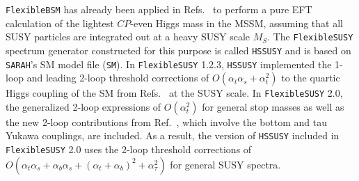 \documentclass[final,3p,11pt,pdflatex]{elsarticle}
\makeatletter
\newcommand{\modelname}[1]{\texttt{#1}\@\xspace}
\newcommand{\sarah}{\texttt{SARAH}\@\xspace}
\newcommand{\fs}{\texttt{FlexibleSUSY}\@\xspace}
\newcommand{\HSSUSY}{\modelname{HSSUSY}}
\newcommand{\fstwo}{\fs 2.0\@\xspace}
\newcommand{\fbsm}{\texttt{FlexibleBSM}\@\xspace}
\newcommand{\MS}{\ensuremath{M_S}\xspace}
\newcommand{\CP}{\ensuremath{CP}\xspace}
\def\at{\alpha_t}
\def\ab{\alpha_b}
\def\as{\alpha_s}
\def\atau{\alpha_{\tau}}
\makeatother
\begin{document}
\fbsm has already been applied in
Refs.~\cite{Bagnaschi:2015pwa,Athron:2016fuq,Bagnaschi:2017xid} to perform a
pure EFT calculation of the lightest \CP-even Higgs mass in the MSSM,
assuming that all SUSY particles are integrated out at a heavy SUSY
scale $\MS$.  The \fs spectrum generator constructed for this purpose
is called \HSSUSY and is based on \sarah's SM model file
(\modelname{SM}).  In \fs 1.2.3, \HSSUSY implemented the 1-loop and leading
2-loop threshold corrections of $O(\at\as + \at^2)$ to the quartic Higgs
coupling of the SM from
Refs.~\cite{Bagnaschi:2014rsa,Vega:2015fna} at the SUSY scale.  In
\fstwo, the generalized 2-loop expressions of $O(\at^2)$ for general stop
masses as well as the new 2-loop contributions from Ref.~\cite{Bagnaschi:2017xid},
which involve the bottom and tau Yukawa couplings, are
included.  As a result, the version of \HSSUSY included in \fstwo uses
the 2-loop threshold corrections of
$O(\at\as + \ab\as + (\at+\ab)^2 + \atau^2)$ for general SUSY spectra.
\end{document}
